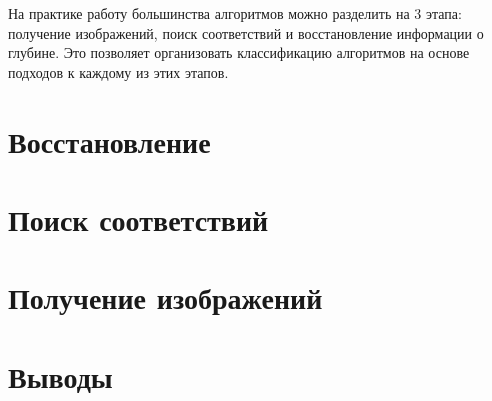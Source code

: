 На практике работу большинства алгоритмов можно разделить на 3 этапа: получение изображений, поиск соответствий и восстановление информации о глубине. Это позволяет
организовать классификацию алгоритмов на основе подходов к каждому из этих этапов. 

\section{Восстановление}

\section{Поиск соответствий}

\section{Получение изображений}


\section{Выводы}

\newpage




